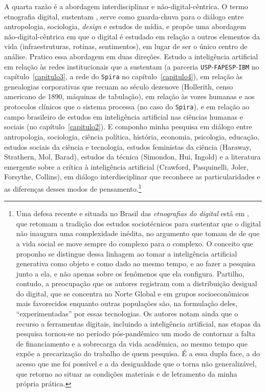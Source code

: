A quarta razão é a abordagem interdisciplinar e não-digital-cêntrica. O termo etnografia digital, sustentam \textcite{Pink2016DigitalEthnography}, serve como guarda-chuva para o diálogo entre antropologia, sociologia, \textit{design} e estudos de mídia, e propõe uma abordagem não-digital-cêntrica em que o digital é estudado em relação a outros elementos da vida (infraestruturas, rotinas, sentimentos), em lugar de ser o único centro de análise. Pratico essa abordagem em duas direções. Estudo a inteligência artificial em relação às redes institucionais que a sustentam (a parceria \texttt{USP}-\texttt{FAPESP}-\texttt{IBM} no capítulo~\ref{capitulo3}, a rede do \texttt{Spira} no capítulo~\ref{capitulo4}), em relação às genealogias corporativas que recuam ao século dezenove (Hollerith, censo americano de 1890, máquinas de tabulação), em relação às vozes humanas e aos protocolos clínicos que o sistema processa (no caso do \texttt{Spira}), e em relação ao campo brasileiro de estudos em inteligência artificial nas ciências humanas e sociais (no capítulo~\ref{capitulo2}). E componho minha pesquisa em diálogo entre antropologia, sociologia, ciência política, história, economia, psicologia, educação, estudos sociais da ciência e tecnologia, estudos feministas da ciência (Haraway, Strathern, Mol, Barad), estudos da técnica (Simondon, Hui, Ingold) e a literatura emergente sobre a crítica à inteligência artificial (Crawford, Pasquinelli, Joler, Forsythe, Collins), em diálogo interdisciplinar que reconhece as particularidades e as diferenças desses modos de pensamento.\footnote{Uma defesa recente e situada no Brasil das \emph{etnografias do digital} está em \textcite{Rifiotis2024Etnografias}, que retomam a tradição dos estudos sociotécnicos para sustentar que o digital não inaugura uma complexidade inédita, no argumento que tomam de \textcite{Strathern1994Comment} de que a vida social se move sempre do complexo para o complexo. O conceito que proponho se distingue dessa linhagem ao tomar a inteligência artificial generativa como objeto e como dado ao mesmo tempo, e ao fazer a pesquisa junto a ela, e não apenas sobre os fenômenos que ela configura. Partilho, contudo, a preocupação que os autores registram com a distribuição desigual do digital, que se concentra no Norte Global e em grupos socioeconômicos mais favorecidos enquanto outras populações são, na formulação deles, \enquote{experimentadas} por essas tecnologias. Os autores notam ainda que o recurso a ferramentas digitais, incluindo a inteligência artificial, nas etapas da pesquisa tornou-se no período pós-pandêmico um modo de contornar a falta de financiamento e a sobrecarga da vida acadêmica, ao mesmo tempo que expõe a precarização do trabalho de quem pesquisa. É a essa dupla face, a do acesso que me foi possível e a da desigualdade que o torna não generalizável, que retorno ao situar as condições materiais e de letramento da minha própria prática.}

